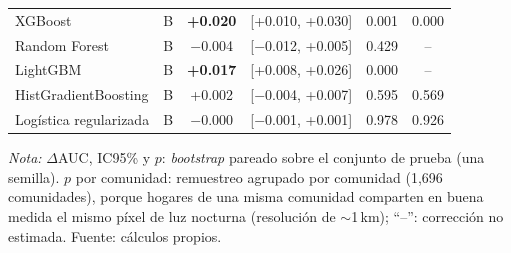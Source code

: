 \begin{table}[H]
\begin{tabular}{llcccc}
    \addlinespace
    XGBoost                  & B & \textbf{+0.020} & [+0.010, +0.030] & 0.001 & 0.000 \\
    Random Forest            & B & $-$0.004 & [$-$0.012, +0.005] & 0.429 & -- \\
    LightGBM                 & B & \textbf{+0.017} & [+0.008, +0.026] & 0.000 & -- \\
    HistGradientBoosting     & B & +0.002 & [$-$0.004, +0.007] & 0.595 & 0.569 \\
    Logística regularizada   & B & $-$0.000 & [$-$0.001, +0.001] & 0.978 & 0.926 \\
    \bottomrule
  \end{tabular}
  \begin{minipage}{0.95\textwidth}
    \vspace{4pt}
    \footnotesize \textit{Nota:} $\Delta$AUC, IC95\% y $p$: \emph{bootstrap} pareado sobre el
    conjunto de prueba (una semilla). $p$ por comunidad:
    remuestreo agrupado por comunidad (1{,}696 comunidades),
    porque hogares de una misma comunidad comparten en buena medida el
    mismo píxel de luz nocturna (resolución de $\sim$1\,km); ``--'':
    corrección no estimada. Fuente: cálculos propios.
  \end{minipage}
\end{table}